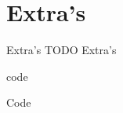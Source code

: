 \documentclass[../presentatie.tex]{subfiles}
\begin{document}
\section{Extra's}

\clearrecentlist
    
\begin{frame}{Extra's}
    TODO Extra's
\end{frame}

\begin{saveblock}{code}
	\begin{highlightblock}[gobble=8,linewidth=0.5\textwidth,framexleftmargin=0.25em]
        Code
	\end{highlightblock}
\end{saveblock}
\end{document}
